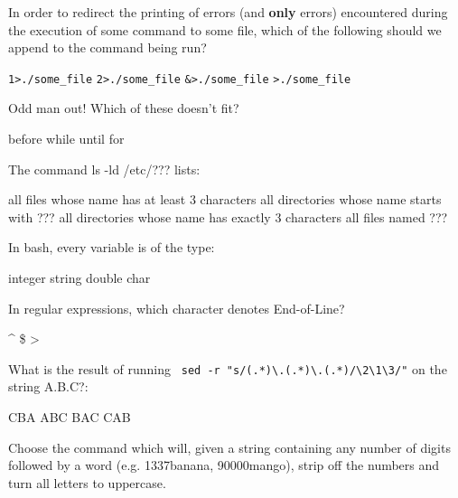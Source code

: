 \documentclass[a4paper,11pt]{exam}
\newcommand{\shell}[1]{\texttt{#1}}
\begin{document}
\begin{questions}
	\question
  In order to redirect the printing of errors (and \textbf{only} errors) encountered during the execution of some command to some file, which of the following should we append to the command being run?

	\begin{oneparchoices}
	  \choice \shell{1>./some_file} 
		\CorrectChoice \shell{2>./some_file} 
		\choice \shell{\&>./some_file} 
		\choice \shell{>./some_file}
	\end{oneparchoices}
	
	\question
	Odd man out! Which of these doesn't fit?
	
	\begin{oneparchoices}
		\CorrectChoice before
		\choice while
		\choice until
		\choice for
	\end{oneparchoices}

	\question
	The command ls -ld /etc/??? lists:
	\begin{oneparchoices}
		\choice all files whose name has at least 3 characters
		\choice all directories whose name starts with ???
    \CorrectChoice all directories whose name has exactly 3 characters
	  \choice all files named ???
	\end{oneparchoices}
	
	\question
  In bash, every variable is of the type:
	
	\begin{oneparchoices}
		\choice integer
		\CorrectChoice string
		\choice double
		\choice char
	\end{oneparchoices}
	
	\question
  In regular expressions, which character denotes End-of-Line?

	\begin{oneparchoices}
		\choice \textasciicircum
		\CorrectChoice \$
		\choice >
		\choice *
	\end{oneparchoices}

	\question
	What is the result of running \verb| sed -r "s/(.*)\.(.*)\.(.*)/\2\1\3/"| on the string A.B.C?:
	
	\begin{oneparchoices}
		\choice CBA
		\choice ABC
		\CorrectChoice BAC
		\choice CAB
	\end{oneparchoices}
	
	\question
	Choose the command which will, given a string containing any number of digits followed by a word (e.g. 1337banana, 90000mango), strip off the numbers and turn all letters to uppercase.


\end{questions}
\end{document}
